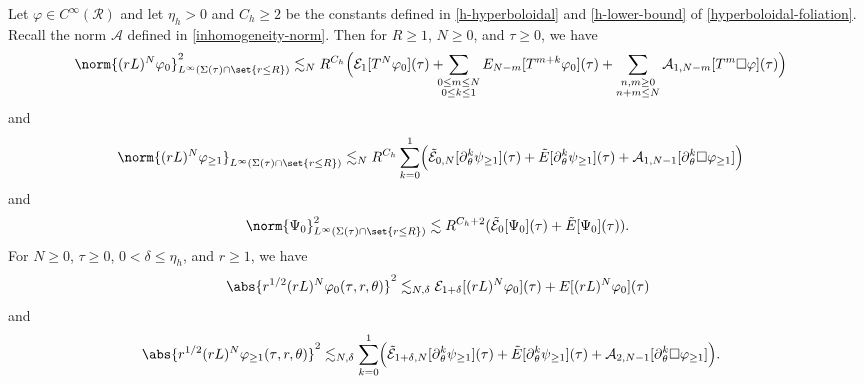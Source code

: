 \documentclass[10pt, reqno]{amsart}
\begin{document}
\begin{proposition}
Let \(\varphi{}\in C^\infty(\mathcal{R})\) and let \(\eta_h > 0\) and \(C_h\ge 2\) be the constants
defined in \cref{h-hyperboloidal} and \cref{h-lower-bound} of
\cref{hyperboloidal-foliation}. Recall the norm \(\mathcal{A}\) defined in
\cref{inhomogeneity-norm}. Then for \(R\ge 1\), \(N\ge 0\), and \(\tau{}\ge 0\), we have
\begin{equation}\label{pointwise-near}
\begin{split}
&\norm{(rL)^N\varphi{}_0}_{L^\infty(\Sigma{}(\tau{})\cap \set{r\le R})}^2 \lesssim_N R^{C_h}\Bigl(\mathcal{E}_1[T^N\varphi{}_0](\tau{}) + \!\!\!\!\sum_{\substack{0\le m\le N \\ 0\le k\le 1}}E_{N-m}[T^{m+k}\varphi{}_0](\tau{}) + \sum_{\substack{n,m\ge 0 \\ n + m \le N}} \mathcal{A}_{1,N-m}[T^m\Box{}\varphi{}](\tau{})\Bigr)
\end{split}
\end{equation}
and
\begin{equation}\label{pointwise-near-tilde}
\begin{split}
&\norm{(rL)^N\varphi{}_{\ge 1}}_{L^\infty(\Sigma{}(\tau{})\cap \set{r\le R})}\lesssim_N R^{C_h}\sum_{k=0}^1\Bigl(\tilde{\mathcal{E}}_{0,N}[\partial{}_\theta^k\psi{}_{\ge 1}](\tau{}) + \tilde{E}[\partial{}_\theta^k\psi{}_{\ge 1}](\tau{}) + \mathcal{A}_{1,N-1}[\partial{}_\theta^k\Box{}\varphi{}_{\ge 1}]\Bigr)
\end{split}
\end{equation}
and
\begin{equation}\label{pointwise-near-Psi}
\norm{\Psi{}_0}_{L^\infty(\Sigma{}(\tau{})\cap \set{r\le R})}^2\lesssim R^{C_h+2}(\tilde{\mathcal{E}}_0[\Psi{}_0](\tau{}) + \tilde{E}[\Psi{}_0](\tau{})).
\end{equation}
For \(N\ge 0\), \(\tau{}\ge 0\), \(0 < \delta{} \le \eta_h\), and \(r\ge 1\), we have
\begin{equation}\label{pointwise-far}
\abs{r^{1/2}(rL)^N\varphi{}_0(\tau{},r,\theta{})}^2 \lesssim_{N,\delta{}}\mathcal{E}_{1+\delta{}}[(rL)^N\varphi{}_0](\tau{}) + E[(rL)^N\varphi{}_0](\tau{})
\end{equation}
and
\begin{equation}\label{pointwise-far-tilde}
\begin{split}
&\abs{r^{1/2}(rL)^N\varphi{}_{\ge 1}(\tau{},r,\theta{})}^2\lesssim_{N,\delta{}} \sum_{k=0}^1\Bigl(\tilde{\mathcal{E}}_{1+\delta{},N}[\partial{}_\theta^k\psi{}_{\ge 1}](\tau{}) + \tilde{E}[\partial{}_\theta^k\psi{}_{\ge 1}](\tau{}) + \mathcal{A}_{2,N-1}[\partial{}_\theta^k\Box{}\varphi{}_{\ge 1}]\Bigr).
\end{split}
\end{equation}
\label{pointwise-estimate-general}
\end{proposition}
\end{document}
